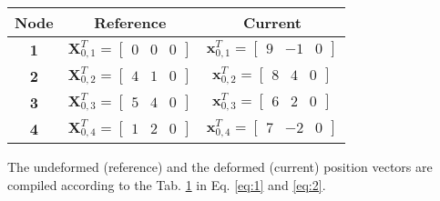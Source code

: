 \documentclass[12pt]{article}
\begin{document}
\begin{table}[ht!]
  \begin{center}
  \label{table:pos}
  \begin{tabular}{ccc}
    Node & Reference & Current \\[0.1 cm] \hline
    \textbf{1} & $\textbf{X}_{0,1}^T = \begin{bmatrix} 0 & 0 & 0 \end{bmatrix}$ & $\textbf{x}_{0,1}^T = \begin{bmatrix} 9 & -1 & 0 \end{bmatrix}$ \\[0.15cm]
    \textbf{2} & $\textbf{X}_{0,2}^T = \begin{bmatrix} 4 & 1 & 0 \end{bmatrix}$ & $\textbf{x}_{0,2}^T = \begin{bmatrix} 8 & 4 & 0 \end{bmatrix}$ \\[0.15cm]
    \textbf{3} & $\textbf{X}_{0,3}^T = \begin{bmatrix} 5 & 4 & 0 \end{bmatrix}$ & $\textbf{x}_{0,3}^T = \begin{bmatrix} 6 & 2 & 0 \end{bmatrix}$ \\[0.15cm]
    \textbf{4} & $\textbf{X}_{0,4}^T = \begin{bmatrix} 1 & 2 & 0 \end{bmatrix}$ & $\textbf{x}_{0,4}^T = \begin{bmatrix} 7 & -2 & 0 \end{bmatrix}$ \\
  \end{tabular}
\end{center}
\end{table}

\noindent The undeformed (reference) and the deformed (current) position vectors are compiled according to the Tab. \ref{table:pos} in Eq. \ref{eq:1} and \ref{eq:2}.
\end{document}
